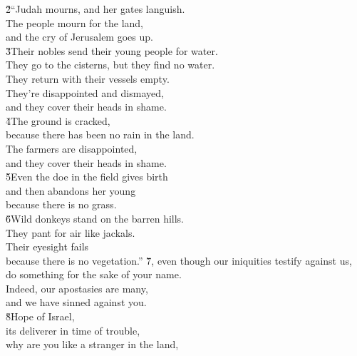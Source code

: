 \begin{poetry}
\poeml \v{2}``Judah mourns, and her gates languish. \\
\poemll    The people mourn for the land, \\
\poemll    and the cry of Jerusalem goes up. \\
\poeml \v{3}Their nobles send their young people for water. \\
\poemll    They go to the cisterns, but they find no water. \\
\poeml They return with their vessels empty. \\
\poemll    They're disappointed and dismayed, \\
\poemlll       and they cover their heads in shame. \\
\poeml \v{4}The ground is cracked, \\
\poemll    because there has been no rain in the land. \\
\poeml The farmers are disappointed, \\
\poemll    and they cover their heads in shame. \\
\poeml \v{5}Even the doe in the field gives birth \\
\poemll    and then abandons her young \\
\poemlll       because there is no grass. \\
\poeml \v{6}Wild donkeys stand on the barren hills. \\
\poemll    They pant for air like jackals. \\
\poeml Their eyesight fails \\
\poemll    because there is no vegetation.''
\poeml \v{7}, even though our iniquities testify against us, \\
\poemll    do something for the sake of your name. \\
\poeml Indeed, our apostasies are many, \\
\poemll    and we have sinned against you. \\
\poeml \v{8}Hope of Israel, \\
\poemll    its deliverer in time of trouble, \\
\poeml why are you like a stranger in the land, \\

\end{poetry}
